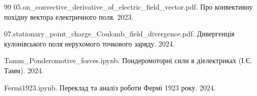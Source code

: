 \documentclass[12pt, a4paper]{article}
\begin{document}
\begin{thebibliography}{99}
05.on\_convective\_derivative\_of\_electric\_field\_vector.pdf. Про конвективну похідну вектора електричного поля. 2023.

07.stationary\_point\_charge\_Coulomb\_field\_divergence.pdf. Дивергенція кулонівського поля нерухомого точкового заряду. 2024.

Tamm\_Ponderomotive\_forces.ipynb. Пондеромоторні сили в діелектриках (І.Є. Тамм). 2024.

Fermi1923.ipynb. Переклад та аналіз роботи Фермі 1923 року. 2024.

\end{thebibliography}
\end{document}
